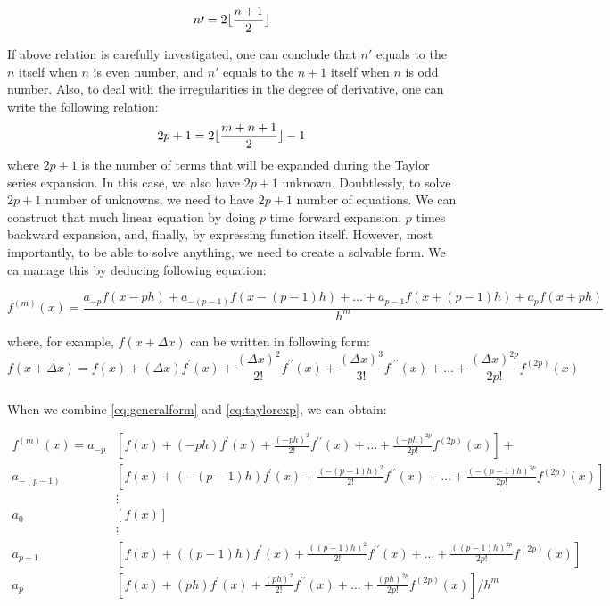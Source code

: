 \documentclass[letterpaper,12pt]{article}
\DeclarePairedDelimiter\floor{\lfloor}{\rfloor}
\begin{document}
\begin{equation*}
    n\prime = 2 \floor{\frac{n+1}{2}}
\end{equation*}

If above relation is carefully investigated, one can conclude that $n\prime$ equals to the $n$ itself when $n$ is even number, and $n\prime$ equals to the $n+1$ itself when $n$ is odd number. Also, to deal with the irregularities in the degree of derivative, one can write the following relation:
\begin{equation*}
    2p+1 = 2\floor{\frac{m+n+1}{2}} - 1
\end{equation*}
where $2p+1$ is the number of terms that will be expanded during the Taylor series expansion. In this case, we also have $2p+1$ unknown. Doubtlessly, to solve $2p+1$ number of unknowns, we need to have $2p+1$ number of equations. We can construct that much linear equation by doing $p$ time forward expansion, $p$ times backward expansion, and, finally, by expressing function itself. However, most importantly, to be able to solve anything, we need to create a solvable form. We ca manage this by deducing following equation:

\begin{equation}
    \label{eq:generalform}
    f^{(m)}(x) =  \frac{a_{-p}f(x-ph) + a_{-(p-1)}f(x-(p-1)h) + \dots +  a_{p-1}f(x+(p-1)h) + a_{p}f(x+ph)}{h^m}
\end{equation}


where, for example, $f(x +  \Delta x)$ can be written in following form:
\begin{equation}
    \label{eq:taylorexp}
    f(x + \Delta x) = f(x) + ( \Delta x)f^\prime(x) + \frac{( \Delta x)^2}{2!}f^{\prime\prime}(x) +  \frac{( \Delta x)^3}{3!}f^{\prime\prime\prime}(x)+\dots+\frac{( \Delta x)^{2p}}{2p!}f^{(2p)}(x)
\end{equation}
\pagebreak
\paragraph{}When we combine  \eqref{eq:generalform} and \eqref{eq:taylorexp}, we can obtain:

\begin{equation}
    \label{eq:stencileqn}
    \begin{split}    
f^{(m)}(x)  = a_{-p}&\left[ f(x) + (-ph)f^\prime(x) + \frac{(-ph)^2}{2!}f^{\prime\prime}(x) + \dots+\frac{(-ph)^{2p}}{2p!}f^{(2p)}(x) \right] + \\
 a_{-(p-1)}&\left[ f(x) + (-(p-1)h)f^\prime(x) + \frac{(-(p-1)h)^2}{2!}f^{\prime\prime}(x) +\dots+\frac{(-(p-1)h)^{2p}}{2p!}f^{(2p)}(x) \right]\\
 &\vdots\\
 a_0&\left[f(x)\right]\\
 &\vdots\\
 a_{p-1}&\left[ f(x) + ((p-1)h)f^\prime(x) + \frac{((p-1)h)^2}{2!}f^{\prime\prime}(x) +\dots+\frac{((p-1)h)^{2p}}{2p!}f^{(2p)}(x) \right]\\
 a_{p}&\left[ f(x) + (ph)f^\prime(x) + \frac{(ph)^2}{2!}f^{\prime\prime}(x) + \dots+\frac{(ph)^{2p}}{2p!}f^{(2p)}(x) \right] / h^m
\end{split}
\end{equation}
\end{document}
